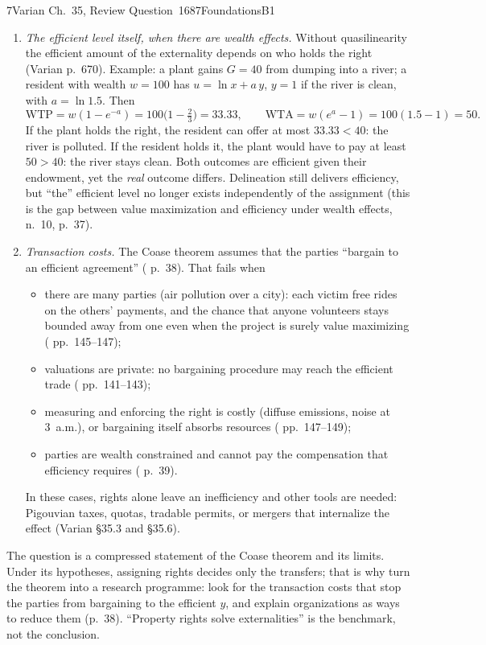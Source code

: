 \begin{exsol}{7}{Varian Ch.~35, Review Question~1}{687}{Foundations}{B1}
\begin{enumerate}[label=(\roman*)]
  \item \emph{The efficient level itself, when there are wealth effects.} Without quasilinearity
  the efficient amount of the externality depends on who holds the right (Varian p.~670).
  Example: a plant gains $G = 40$ from dumping into a river; a resident with wealth $w = 100$ has
  $u = \ln x + a\,y$, $y = 1$ if the river is clean, with $a = \ln 1.5$. Then
  \[
    \text{WTP} = w(1 - e^{-a}) = 100\big(1 - \tfrac{2}{3}\big) = 33.33, \qquad
    \text{WTA} = w(e^{a} - 1) = 100(1.5 - 1) = 50 .
  \]
  If the plant holds the right, the resident can offer at most $33.33 < 40$: the river is
  polluted. If the resident holds it, the plant would have to pay at least $50 > 40$: the river
  stays clean. Both outcomes are efficient given their endowment, yet the \emph{real} outcome
  differs. Delineation still delivers efficiency, but ``the'' efficient level no longer exists
  independently of the assignment (this is the gap between value maximization and efficiency
  under wealth effects, \MR{} n.~10, p.~37).

  \item \emph{Transaction costs.} The Coase theorem assumes that the parties ``bargain to an
  efficient agreement'' (\MR{} p.~38). That fails when
  \begin{itemize}
    \item there are many parties (air pollution over a city): each victim free rides on the
    others' payments, and the chance that anyone volunteers stays bounded away from one even when
    the project is surely value maximizing (\MR{} pp.~145--147);
    \item valuations are private: no bargaining procedure may reach the efficient trade
    (\MR{} pp.~141--143);
    \item measuring and enforcing the right is costly (diffuse emissions, noise at 3~a.m.), or
    bargaining itself absorbs resources (\MR{} pp.~147--149);
    \item parties are wealth constrained and cannot pay the compensation that efficiency
    requires (\MR{} p.~39).
  \end{itemize}
  In these cases, rights alone leave an inefficiency and other tools are needed: Pigouvian taxes,
  quotas, tradable permits, or mergers that internalize the effect (Varian \S35.3 and \S35.6).
\end{enumerate}

\interp The question is a compressed statement of the Coase theorem and its limits. Under its
hypotheses, assigning rights decides only the transfers; that is why \MR{} turn the theorem into
a research programme: look for the transaction costs that stop the parties from bargaining to the
efficient $y$, and explain organizations as ways to reduce them (p.~38). ``Property rights solve
externalities'' is the benchmark, not the conclusion.


\end{exsol}
